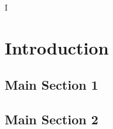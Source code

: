 I%

\chapter{Introduction} %

\label{Introduction} %



\section{Main Section 1}





\section{Main Section 2}
